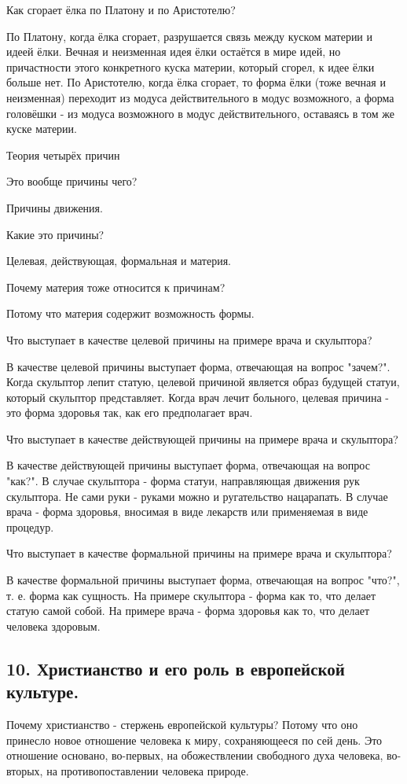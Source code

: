 \documentclass[a4paper, 12pt]{article}
\begin{document}
Как сгорает ёлка по Платону и по Аристотелю?

По Платону, когда ёлка сгорает, разрушается связь между куском материи и идеей ёлки. Вечная и неизменная идея ёлки остаётся в мире идей, но причастности этого конкретного куска материи, который сгорел, к идее ёлки больше нет.
По Аристотелю, когда ёлка сгорает, то форма ёлки (тоже вечная и неизменная) переходит из модуса действительного в модус возможного, а форма головёшки - из модуса возможного в модус действительного, оставаясь в том же куске материи.

Теория четырёх причин

Это вообще причины чего?

Причины движения.

Какие это причины?

Целевая, действующая, формальная и материя.

Почему материя тоже относится к причинам?

Потому что материя содержит возможность формы.

Что выступает в качестве целевой причины на примере врача и скульптора?

В качестве целевой причины выступает форма, отвечающая на вопрос "зачем?".
Когда скульптор лепит статую, целевой причиной является образ будущей статуи, который скульптор представляет.
Когда врач лечит больного, целевая причина - это форма здоровья так, как его предполагает врач.

Что выступает в качестве действующей причины на примере врача и скульптора?

В качестве действующей причины выступает форма, отвечающая на вопрос "как?".
В случае скульптора - форма статуи, направляющая движения рук скульптора. Не сами руки - руками можно и ругательство нацарапать.
В случае врача - форма здоровья, вносимая в виде лекарств или применяемая в виде процедур.

Что выступает в качестве формальной причины на примере врача и скульптора?

В качестве формальной причины выступает форма, отвечающая на вопрос "что?", т. е. форма как сущность.
На примере скульптора - форма как то, что делает статую самой собой.
На примере врача - форма здоровья как то, что делает человека здоровым.


\subsection*{\textbf{10. Христианство и его роль в европейской культуре.}}
Почему христианство - стержень европейской культуры?
Потому что оно принесло новое отношение человека к миру, сохраняющееся по сей день.
Это отношение основано, во-первых, на обожествлении свободного духа человека, во-вторых, на противопоставлении человека природе.
\end{document}
